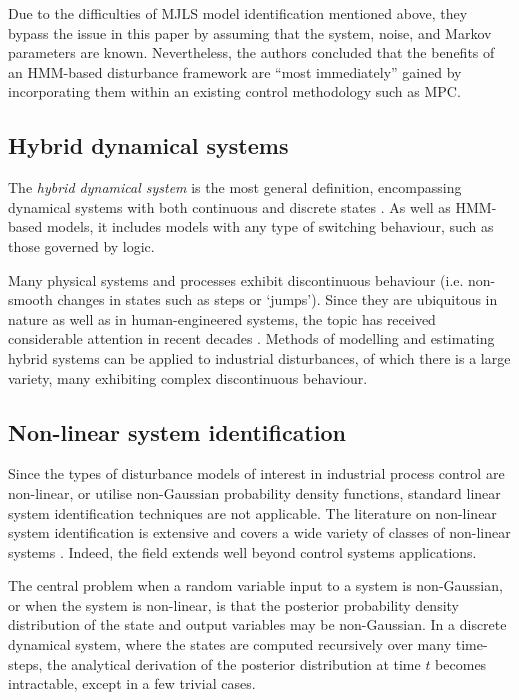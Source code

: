 Due to the difficulties of MJLS model identification mentioned above, they bypass the issue in this paper by assuming that the system, noise, and Markov parameters are known. Nevertheless, the authors concluded that the benefits of an HMM-based disturbance framework are ``most immediately'' gained by incorporating them within an existing control methodology such as MPC.

\subsection{Hybrid dynamical systems}

The \textit{hybrid dynamical system} is the most general definition, encompassing dynamical systems with both continuous and discrete states \citep{van_der_schaft_introduction_2000}. As well as HMM-based models, it includes models with any type of switching behaviour, such as those governed by logic.

Many physical systems and processes exhibit discontinuous behaviour (i.e. non-smooth changes in states such as steps or ‘jumps’). Since they are ubiquitous in nature as well as in human-engineered systems, the topic has received considerable attention in recent decades \citep{sworder_boyd_1999, bemporad_identification_2001, costa_discrete-time_2005, camacho_model_2010, djemai_hybrid_2014, estrada_hybrid_2014, guo_moving_2013, botha_hybrid_2018, bemporad_fitting_2018, oliveira_iterative_2020, piga_estimation_2020}. Methods of modelling and estimating hybrid systems can be applied to industrial disturbances, of which there is a large variety, many exhibiting complex discontinuous behaviour.

\subsection{Non-linear system identification}

Since the types of disturbance models of interest in industrial process control are non-linear, or utilise non-Gaussian probability density functions, standard linear system identification techniques are not applicable. The literature on non-linear system identification is extensive and covers a wide variety of classes of non-linear systems \citep{schoukens_nonlinear_2019}. Indeed, the field extends well beyond control systems applications.


The central problem when a random variable input to a system is non-Gaussian, or when the system is non-linear, is that the posterior probability density distribution of the state and output variables may be non-Gaussian. In a discrete dynamical system, where the states are computed recursively over many time-steps, the analytical derivation of the posterior distribution at time $t$ becomes intractable, except in a few trivial cases.

